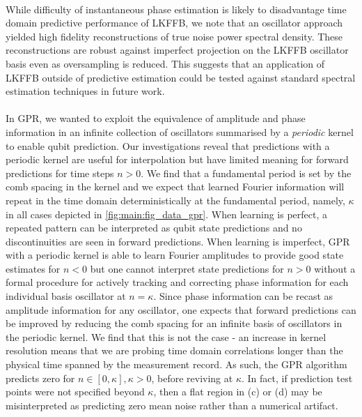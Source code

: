 \\
While difficulty of instantaneous phase estimation is likely to disadvantage time domain predictive performance of LKFFB, we note that an oscillator approach yielded high fidelity reconstructions of true noise power spectral density. These reconstructions are robust against imperfect projection on the LKFFB oscillator basis even as oversampling is reduced. This suggests that an application of LKFFB outside of predictive estimation could be tested against standard spectral estimation techniques in future work.
\\
\\
In GPR, we wanted to exploit the equivalence of amplitude and phase information in an infinite collection of oscillators summarised by a \textit{periodic} kernel to enable qubit prediction. Our investigations reveal that predictions with a periodic kernel are useful for interpolation but have limited meaning for forward predictions for time steps $n >0$.  We find that a fundamental period is set by the comb spacing in the kernel and we expect that learned Fourier information will repeat in the time domain deterministically at the fundamental period, namely, $\kappa$ in all cases depicted in \cref{fig:main:fig_data_gpr}. When learning is perfect, a repeated pattern can be interpreted as qubit state predictions and no discontinuities are seen in forward predictions. When learning is imperfect, GPR  with a periodic kernel is able to learn Fourier amplitudes to provide good state estimates for $n<0$ but one cannot interpret state predictions for $n>0$ without a formal procedure for actively tracking and correcting phase information for each individual basis oscillator at $n= \kappa$. Since phase information can be recast as amplitude information for any oscillator, one expects that forward predictions can be improved by reducing the comb spacing for an infinite basis of oscillators in the periodic kernel.  We find that this is not the case - an increase in kernel resolution means that we are probing time domain correlations longer than the physical time spanned by the measurement record. As such, the GPR algorithm predicts zero for $n \in [0, \kappa], \kappa > 0$, before reviving at $\kappa$.  In fact, if prediction test points were not specified beyond $\kappa$, then a flat region in (c) or (d) may be misinterpreted as predicting zero mean noise rather than a numerical artifact.
\\
\\
